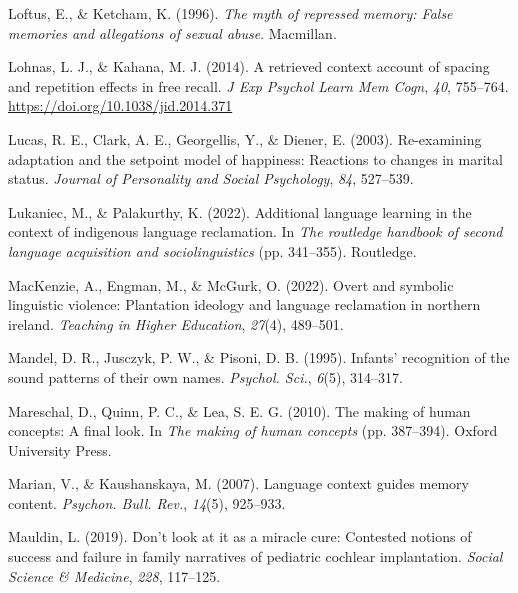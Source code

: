 \documentclass[
]{krantz}
\newlength{\cslhangindent}
\newlength{\cslentryspacingunit} %
\newenvironment{CSLReferences}[2] %
 {%
  \setlength{\parindent}{0pt}
  \ifodd #1
  \let\oldpar\par
  \def\par{\hangindent=\cslhangindent\oldpar}
  \fi
  \setlength{\parskip}{#2\cslentryspacingunit}
 }%
 {}
\begin{document}
\begin{CSLReferences}{1}{0}
\leavevmode{}%
Loftus, E., \& Ketcham, K. (1996). \emph{The myth of repressed memory: False memories and allegations of sexual abuse}. Macmillan.

\leavevmode{}%
Lohnas, L. J., \& Kahana, M. J. (2014). A retrieved context account of spacing and repetition effects in free recall. \emph{J Exp Psychol Learn Mem Cogn}, \emph{40}, 755--764. \url{https://doi.org/10.1038/jid.2014.371}

\leavevmode{}%
Lucas, R. E., Clark, A. E., Georgellis, Y., \& Diener, E. (2003). Re-examining adaptation and the setpoint model of happiness: Reactions to changes in marital status. \emph{Journal of Personality and Social Psychology}, \emph{84}, 527--539.

\leavevmode{}%
Lukaniec, M., \& Palakurthy, K. (2022). Additional language learning in the context of indigenous language reclamation. In \emph{The routledge handbook of second language acquisition and sociolinguistics} (pp. 341--355). Routledge.

\leavevmode{}%
MacKenzie, A., Engman, M., \& McGurk, O. (2022). Overt and symbolic linguistic violence: Plantation ideology and language reclamation in northern ireland. \emph{Teaching in Higher Education}, \emph{27}(4), 489--501.

\leavevmode{}%
Mandel, D. R., Jusczyk, P. W., \& Pisoni, D. B. (1995). Infants' recognition of the sound patterns of their own names. \emph{Psychol. Sci.}, \emph{6}(5), 314--317.

\leavevmode{}%
Mareschal, D., Quinn, P. C., \& Lea, S. E. G. (2010). The making of human concepts: A final look. In \emph{The making of human concepts} (pp. 387--394). Oxford University Press.

\leavevmode{}%
Marian, V., \& Kaushanskaya, M. (2007). Language context guides memory content. \emph{Psychon. Bull. Rev.}, \emph{14}(5), 925--933.

\leavevmode{}%
Mauldin, L. (2019). Don't look at it as a miracle cure: Contested notions of success and failure in family narratives of pediatric cochlear implantation. \emph{Social Science \& Medicine}, \emph{228}, 117--125.


\end{CSLReferences}
\end{document}
